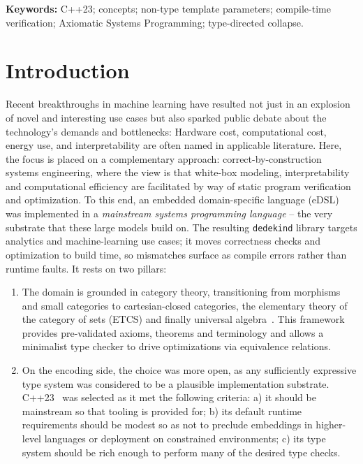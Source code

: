 \documentclass[11pt, a4paper]{article}
\begin{document}
\newpage
\tableofcontents
\newpage

\vspace{0.75em}
\noindent\textbf{Keywords:} C++23; concepts; non-type template
parameters; compile-time verification; Axiomatic Systems Programming;
type-directed collapse.

\section{Introduction}
\label{sec:introduction}

Recent breakthroughs in machine learning have resulted not just in an explosion of novel and interesting use cases but also sparked public debate about the technology's demands and bottlenecks:
Hardware cost, computational cost, energy use, and interpretability are often named in applicable literature.
Here, the focus is placed on a complementary approach: correct-by-construction systems engineering, where the view is that white-box modeling, interpretability and computational efficiency are facilitated by way of static program verification and optimization.
To this end, an embedded domain-specific language (eDSL) was implemented in a \emph{mainstream systems programming language} -- the very substrate that these large models build on.
The resulting \texttt{dedekind} library targets analytics and machine-learning use cases; it moves correctness checks and optimization to build time, so mismatches surface as compile errors rather than runtime faults.
It rests on two pillars:
\begin{enumerate}
\item The domain is grounded in category theory, transitioning from morphisms and small categories to cartesian-closed categories, the elementary theory of the category of sets (ETCS) and finally universal algebra~\cite{pierce2002tapl, lawvere1964etcs}. 
This framework provides pre-validated axioms, theorems and terminology and allows a minimalist type checker to drive optimizations via equivalence relations. 
\item On the encoding side, the choice was more open, as any sufficiently expressive type system was considered to be a plausible implementation substrate.
C++23~\cite{cpp23standard} was selected as it met the following criteria:
a) it should be mainstream so that tooling is provided for;
b) its default runtime requirements should be modest so as not to preclude embeddings in higher-level languages or deployment on constrained environments;
c) its type system should be rich enough to perform many of the desired type checks.
\end{enumerate}
\end{document}
